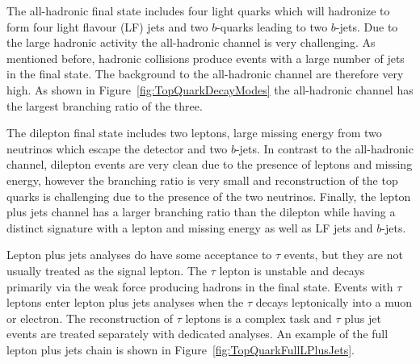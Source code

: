 The all-hadronic final state includes four light quarks which will hadronize to form four light flavour (LF) jets and two $b$-quarks leading to two $b$-jets. Due to the large hadronic activity the all-hadronic channel is very challenging. As mentioned before, hadronic collisions produce events with a large number of jets in the final state. The background to the all-hadronic channel are therefore very high. As shown in Figure~\ref{fig:TopQuarkDecayModes} the all-hadronic channel has the largest branching ratio of the three.

The dilepton final state includes two leptons, large missing energy from two neutrinos which escape the detector and two $b$-jets. In contrast to the all-hadronic channel, dilepton events are very clean due to the presence of leptons and missing energy, however the branching ratio is very small and reconstruction of the top quarks is challenging due to the presence of the two neutrinos. Finally, the lepton plus jets channel has a larger branching ratio than the dilepton while having a distinct signature with a lepton and missing energy as well as LF jets and $b$-jets.

Lepton plus jets analyses do have some acceptance to $\tau$ events, but they are not usually treated as the signal lepton. The $\tau$ lepton is unstable and decays primarily via the weak force producing hadrons in the final state. Events with $\tau$ leptons enter lepton plus jets analyses when the $\tau$ decays leptonically into a muon or electron. The reconstruction of $\tau$ leptons is a complex task and $\tau$ plus jet events are treated separately with dedicated analyses. An example of the full lepton plus jets chain is shown in Figure~\ref{fig:TopQuarkFullLPlusJets}.

